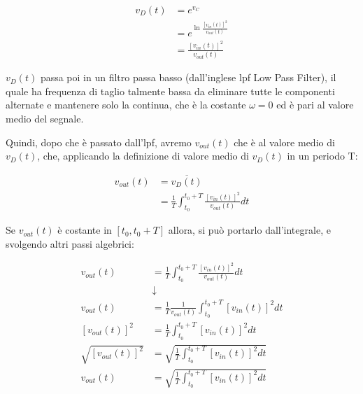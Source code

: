 {
    \Large 
    \begin{equation}
        \begin{split}
            v_D (t)
            &= 
            e^{v_C}
            \\
            &= 
            e^{\ln \frac{[v_{in} (t)]^{2}}{v_{out} (t)} }
            \\
            &= 
            \frac{[v_{in} (t)]^{2}}{v_{out} (t)}
        \end{split}
    \end{equation}
}

$v_D (t)$ passa poi in un filtro passa basso (dall'inglese lpf Low Pass Filter), 
il quale ha frequenza di taglio talmente bassa da eliminare tutte le componenti alternate e mantenere solo la continua, 
che è la costante $\omega = 0 $ ed è pari al valore medio del segnale. \newline 

Quindi, dopo che è passato dall'lpf, avremo $v_{out} (t)$ che è al valore medio di $v_D (t)$, che, applicando la definizione di valore medio di $v_D (t)$ in un periodo T: 

{
    \Large 
    \begin{equation}
        \begin{split}
        v_{out} (t)
        &= 
        \overline{v_D (t)}
        \\
        &=
        \frac{1}{T}
        \int_{t_0}^{t_0 + T}
        \frac{[v_{in} (t)]^{2}}{v_{out} (t)} dt
        \end{split}
    \end{equation}
}

Se $v_{out} (t)$ è costante in $[t_0, t_0 + T]$ allora, si può portarlo dall'integrale, 
e svolgendo altri passi algebrici: 

{
    \Large
    \begin{equation}
        \begin{split}
        v_{out} (t) 
        &=
        \frac{1}{T}
        \int_{t_0}^{t_0 + T}
        \frac{[v_{in} (t)]^{2}}{v_{out} (t)} dt
        \\
        &\downarrow
        \\
        v_{out} (t) 
        &=
        \frac{1}{T}
        \frac{1}{v_{out} (t)}
        \int_{t_0}^{t_0 + T}
        [v_{in} (t)]^{2} dt
        \\
        [v_{out} (t)]^{2} 
        &=
        \frac{1}{T}
        \int_{t_0}^{t_0 + T}
        [v_{in} (t)]^{2} dt
        \\
        \sqrt{[v_{out} (t)]^{2}} 
        &=
        \sqrt
        {
        \frac{1}{T}
        \int_{t_0}^{t_0 + T}
        [v_{in} (t)]^{2} dt
        }
        \\
        v_{out} (t)
        &=
        \sqrt
        {
        \frac{1}{T}
        \int_{t_0}^{t_0 + T}
        [v_{in} (t)]^{2} dt
        }
        \end{split}
    \end{equation}
}


